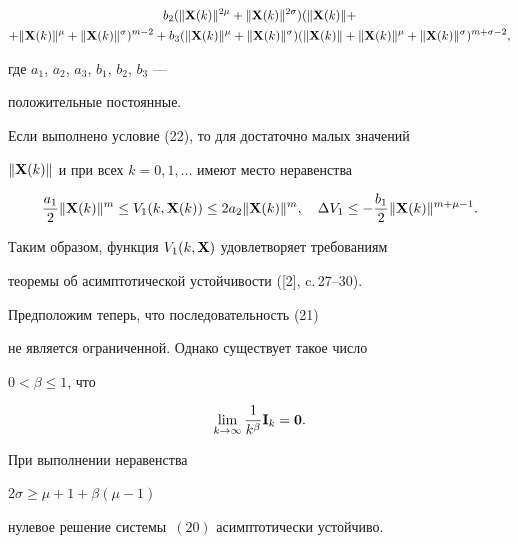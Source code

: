 \begin{pf}
\begin{gather*}
b_2 (\|\bold X(k)\|^{2 \mu}+ \|\bold X(k)\|^{2 \sigma})


(\|\bold X(k)\|+ \\


%


+\|\bold X(k)\|^{\mu}+\|\bold X(k)\|^{\sigma})^{m-2}


+b_3 (\|\bold X(k)\|^{\mu}+ \|\bold X(k)\|^{ \sigma})


(\|\bold X(k)\|+ \|\bold X(k)\|^{\mu}+\|\bold X(k)\|^{\sigma}


)^{m+\sigma-2},


\end{gather*}


где $a_1$, $a_2$, $a_3$, $b_1$, $b_2$, $b_3$ ---


положительные постоянные.





Если выполнено условие (22), то для достаточно малых значений


$\|\bold X(k)\|$ и при всех $k=0,1,\dotsc$ имеют место неравенства


$$


\frac{a_1}2 \|\bold X(k)\|^{m}


\leq V_1(k, \bold X(k))\leq 2 a_2 \|\bold X(k)\|^{m}, \quad


\Delta V_1\leq -\frac{b_1}2 \|\bold X(k)\|^{m+\mu-1}.


$$


Таким образом, функция $V_1(k,\bold X)$ удовлетворяет требованиям 


теоремы об асимптотической устойчивости ([2], c.\,27--30).


\end{pf}





Предположим теперь, что последовательность (21)


не является ограниченной. Однако существует такое число 


$0< \beta \leq 1$, что


\begin{equation}


\lim_{k\to \infty} \frac1{k^\beta} \bold I_k=\bold 0.


\end{equation}





\begin{thm}


При выполнении неравенства


$2\sigma\geq\mu+1+\beta(\mu-1)$


нулевое решение системы~$(20)$ асимптотически устойчиво.


\end{thm}





